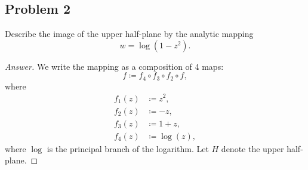 \documentclass[12pt]{article}
\theoremstyle{definition}
\begin{document}
\subsection{Problem 2}
Describe the image of the upper half-plane by the analytic mapping 
\[
    w = \log(1-z^2).
\]
\begin{proof}[Answer]
    We write the mapping as a composition of 4 maps: 
    \[
        f \coloneqq f_4 \circ f_3 \circ f_2 \circ f , 
    \]
    where 
    \begin{align*}
        f_1(z) & \coloneqq z^2 , \\ 
        f_2(z) & \coloneqq -z , \\ 
        f_3(z) & \coloneqq 1 + z , \\ 
        f_4(z) & \coloneqq \log(z) , 
    \end{align*}
    where $\log$ is the principal branch of the logarithm. Let $H$ denote the upper half-plane. 
    

\end{proof}
\end{document}
